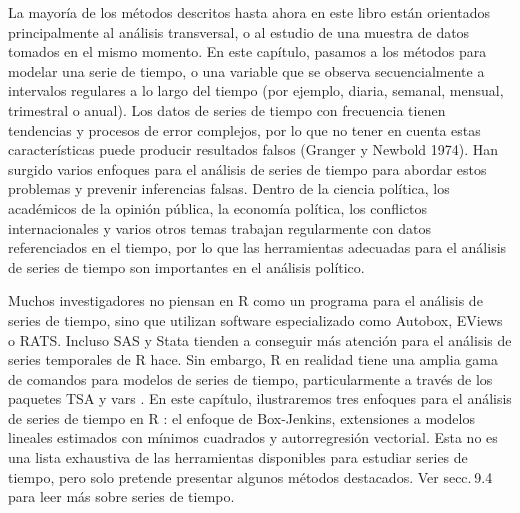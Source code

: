 \documentclass[
]{book}
\begin{document}
La mayoría de los métodos descritos hasta ahora en este libro están orientados principalmente al análisis transversal, o al estudio de una muestra de datos tomados en el mismo momento. En este capítulo, pasamos a los métodos para modelar una serie de tiempo, o una variable que se observa secuencialmente a intervalos regulares a lo largo del tiempo (por ejemplo, diaria, semanal, mensual, trimestral o anual). Los datos de series de tiempo con frecuencia tienen tendencias y procesos de error complejos, por lo que no tener en cuenta estas características puede producir resultados falsos (Granger y Newbold 1974). Han surgido varios enfoques para el análisis de series de tiempo para abordar estos problemas y prevenir inferencias falsas. Dentro de la ciencia política, los académicos de la opinión pública, la economía política, los conflictos internacionales y varios otros temas trabajan regularmente con datos referenciados en el tiempo, por lo que las herramientas adecuadas para el análisis de series de tiempo son importantes en el análisis político.

Muchos investigadores no piensan en R como un programa para el análisis de series de tiempo, sino que utilizan software especializado como Autobox, EViews o RATS. Incluso SAS y Stata tienden a conseguir más atención para el análisis de series temporales de R hace. Sin embargo, R en realidad tiene una amplia gama de comandos para modelos de series de tiempo, particularmente a través de los paquetes TSA y vars . En este capítulo, ilustraremos tres enfoques para el análisis de series de tiempo en R : el enfoque de Box-Jenkins, extensiones a modelos lineales estimados con mínimos cuadrados y autorregresión vectorial. Esta no es una lista exhaustiva de las herramientas disponibles para estudiar series de tiempo, pero solo pretende presentar algunos métodos destacados. Ver secc. 9.4 para leer más sobre series de tiempo.
\end{document}
